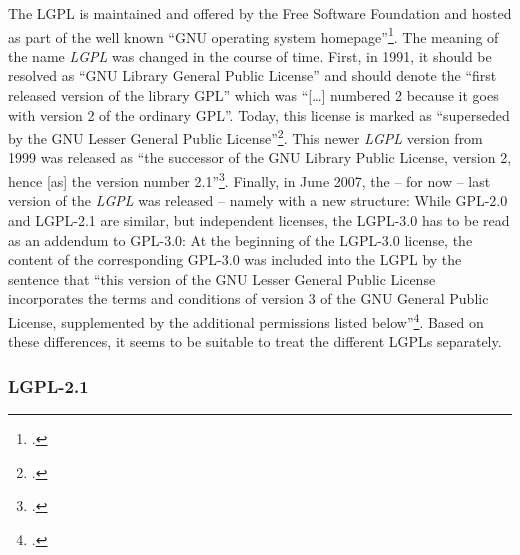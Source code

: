 The LGPL is maintained and offered by the Free Software Foundation and hosted as
part of the well known \enquote{GNU operating system
homepage}\footcite[cf.][\nopage wp]{FsfGnuOsLicenses2011a}. The meaning of the
name \emph{LGPL} was changed in the course of time. First, in 1991, it should be
resolved as \enquote{GNU Library General Public License} and should denote the
\enquote{first released version of the library GPL} which was \enquote{[\ldots]
numbered 2 because it goes with version 2 of the ordinary GPL}. Today, this
license is marked as \enquote{superseded by the GNU Lesser General Public
License}\footcite[cf.][\nopage wp]{Lgpl20FsfLicense1991a}. This newer
\emph{LGPL} version from 1999 was released as \enquote{the successor of the GNU
Library Public License, version 2, hence [as] the version number
2.1}\footcite[cf.][\nopage wp]{Lgpl21FsfLicense1999a}. Finally, in June 2007,
the -- for now -- last version of the \emph{LGPL} was released -- namely with a
new structure: While GPL-2.0 and LGPL-2.1 are similar, but independent licenses,
the LGPL-3.0 has to be read as an addendum to GPL-3.0: At the beginning of the
LGPL-3.0 license, the content of the corresponding GPL-3.0 was included into
the LGPL by the sentence that \enquote{this version of the GNU Lesser General
Public License incorporates the terms and conditions of version 3 of the GNU
General Public License, supplemented by the additional permissions listed
below}\footcite[cf.][\nopage wp]{Lgpl30FsfLicense2007a}. Based on these
differences, it seems to be suitable to treat the different LGPLs separately.

\subsubsection {LGPL-2.1} \label{subsec:ProtectingPowerOfLgpl21}

